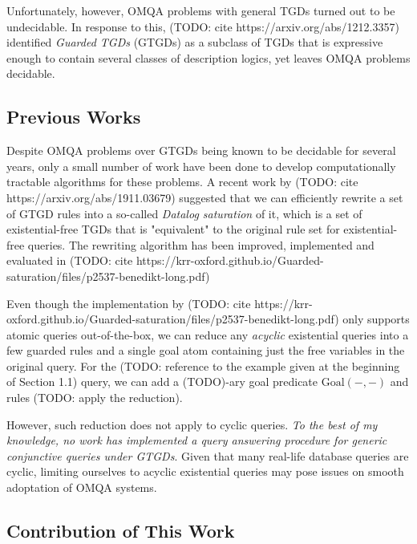 \documentclass[12pt]{article}
\begin{document}
Unfortunately, however, OMQA problems with general TGDs turned out to be undecidable. In response to this, (TODO: cite https://arxiv.org/abs/1212.3357) identified \emph{Guarded TGDs} (GTGDs) as a subclass of TGDs that is expressive enough to contain several classes of description logics, yet leaves OMQA problems decidable.

\subsection{Previous Works}

Despite OMQA problems over GTGDs being known to be decidable for several years, only a small number of work have been done to develop computationally tractable algorithms for these problems. A recent work by (TODO: cite https://arxiv.org/abs/1911.03679) suggested that we can efficiently rewrite a set of GTGD rules into a so-called \emph{Datalog saturation} of it, which is a set of existential-free TGDs that is "equivalent" to the original rule set for existential-free queries. The rewriting algorithm has been improved, implemented and evaluated in (TODO: cite https://krr-oxford.github.io/Guarded-saturation/files/p2537-benedikt-long.pdf)

Even though the implementation by (TODO: cite https://krr-oxford.github.io/Guarded-saturation/files/p2537-benedikt-long.pdf) only supports atomic queries out-of-the-box, we can reduce any \emph{acyclic} existential queries into a few guarded rules and a single goal atom containing just the free variables in the original query. For the (TODO: reference to the example given at the beginning of Section 1.1) query, we can add a (TODO)-ary goal predicate $\mathrm{Goal}(-, -)$ and rules (TODO: apply the reduction).

However, such reduction does not apply to cyclic queries. \emph{To the best of my knowledge, no work has implemented a query answering procedure for generic conjunctive queries under GTGDs}. Given that many real-life database queries are cyclic, limiting ourselves to acyclic existential queries may pose issues on smooth adoptation of OMQA systems. %

\subsection{Contribution of This Work}
\end{document}
